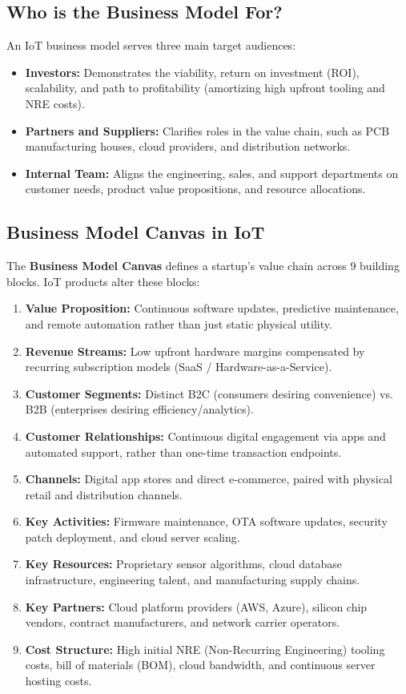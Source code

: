 \documentclass[12pt,a4paper]{article}
\begin{document}
\subsection{Who is the Business Model For?}
An IoT business model serves three main target audiences:
\begin{itemize}[leftmargin=*, itemsep=3.0pt]
  \item \textbf{Investors:} Demonstrates the viability, return on investment (ROI), scalability, and path to profitability (amortizing high upfront tooling and NRE costs).
  \item \textbf{Partners and Suppliers:} Clarifies roles in the value chain, such as PCB manufacturing houses, cloud providers, and distribution networks.
  \item \textbf{Internal Team:} Aligns the engineering, sales, and support departments on customer needs, product value propositions, and resource allocations.
\end{itemize}

\subsection{Business Model Canvas in IoT}
The \textbf{Business Model Canvas} defines a startup's value chain across 9 building blocks. IoT products alter these blocks:
\begin{enumerate}[leftmargin=*, itemsep=3.0pt]
  \item \textbf{Value Proposition:} Continuous software updates, predictive maintenance, and remote automation rather than just static physical utility.
  \item \textbf{Revenue Streams:} Low upfront hardware margins compensated by recurring subscription models (SaaS / Hardware-as-a-Service).
  \item \textbf{Customer Segments:} Distinct B2C (consumers desiring convenience) vs. B2B (enterprises desiring efficiency/analytics).
  \item \textbf{Customer Relationships:} Continuous digital engagement via apps and automated support, rather than one-time transaction endpoints.
  \item \textbf{Channels:} Digital app stores and direct e-commerce, paired with physical retail and distribution channels.
  \item \textbf{Key Activities:} Firmware maintenance, OTA software updates, security patch deployment, and cloud server scaling.
  \item \textbf{Key Resources:} Proprietary sensor algorithms, cloud database infrastructure, engineering talent, and manufacturing supply chains.
  \item \textbf{Key Partners:} Cloud platform providers (AWS, Azure), silicon chip vendors, contract manufacturers, and network carrier operators.
  \item \textbf{Cost Structure:} High initial NRE (Non-Recurring Engineering) tooling costs, bill of materials (BOM), cloud bandwidth, and continuous server hosting costs.
\end{enumerate}
\end{document}
